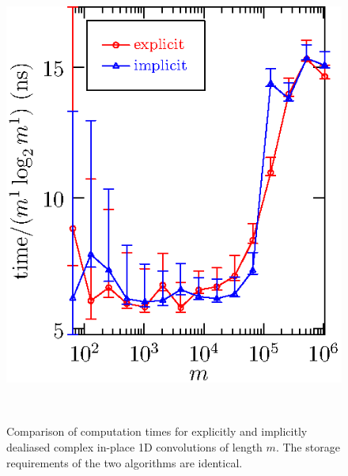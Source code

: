 \documentclass[final]{siamltex}
\begin{document}
\begin{figure}[htbp]
\begin{minipage}{0.49\linewidth}
\begin{center}
\includegraphics{timing1c}
\caption{Comparison of computation times for explicitly and implicitly
dealiased complex in-place 1D convolutions of length $m$. The storage
requirements of the two algorithms are identical.}
\label{timing1c}
\end{center}
\end{minipage}
\,
\begin{minipage}{0.49\linewidth}
\begin{center}

\end{center}
\end{minipage}
\end{figure}
\end{document}

